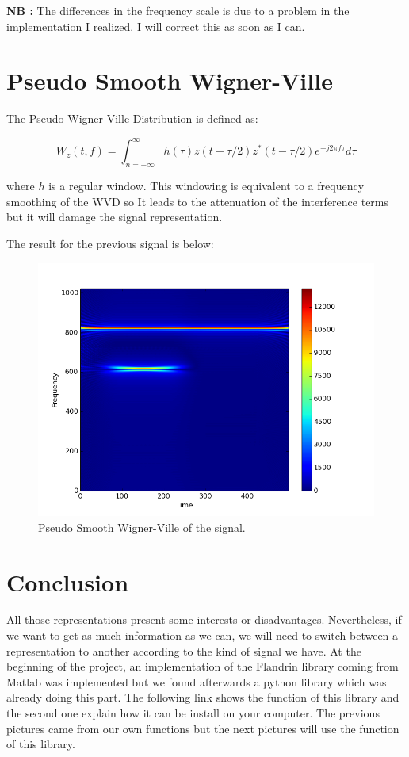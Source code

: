 \textbf{NB :} The differences in the frequency scale is due to a problem in the implementation I realized. I will correct this as soon as I can.

\chapter{Pseudo Smooth Wigner-Ville}

The  Pseudo-Wigner-Ville Distribution is defined as:

\begin{equation}
W_z(t,f) = \int_{n=-\infty}^{\infty} h ( \tau ) z ( t + \tau / 2 ) z^* (t - \tau / 2) e^{-j 2 \pi f \tau} d \tau
\end{equation}

where $h$ is a regular window. This windowing is equivalent to a frequency smoothing of the WVD so It leads to the attenuation of the interference terms but it will damage the signal representation.

The result for the previous signal is below:

\begin{figure}[H]
\centering
    \includegraphics[scale=0.5,angle=0]{Images/SignalSimple_PSWV.png}
    \caption{Pseudo Smooth Wigner-Ville of the signal.}
    \label{fig:SignalSimple_PSWV}
\end{figure}

\chapter*{Conclusion}
\bigskip
All those representations present some interests or disadvantages. Nevertheless, if we want to get as much information as we can, we will need to switch between a representation to another according to the kind of signal we have. At the beginning of the project, an implementation of the Flandrin library coming from Matlab was implemented but we found afterwards a python library which was already doing this part. The following link shows the function of this library and the second one explain how it can be install on your computer. The previous pictures came from our own functions but the next pictures will use the function of this library.

